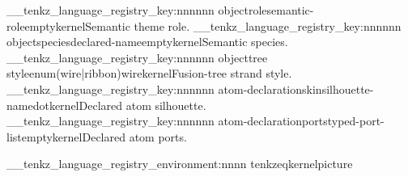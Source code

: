 \__tenkz_language_registry_key:nnnnnn {object}{role}{semantic-role}{empty}{kernel}{Semantic theme role.}
\__tenkz_language_registry_key:nnnnnn {object}{species}{declared-name}{empty}{kernel}{Semantic species.}
\__tenkz_language_registry_key:nnnnnn {object}{tree style}{enum(wire|ribbon)}{wire}{kernel}{Fusion-tree strand style.}
\__tenkz_language_registry_key:nnnnnn {atom-declaration}{skin}{silhouette-name}{dot}{kernel}{Declared atom silhouette.}
\__tenkz_language_registry_key:nnnnnn {atom-declaration}{ports}{typed-port-list}{empty}{kernel}{Declared atom ports.}


%
%
%
%
\__tenkz_language_registry_environment:nnnn {tenkzeq}{kernel}{picture}
